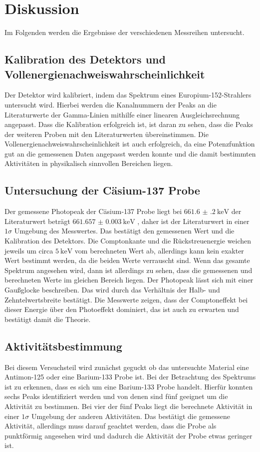 \section{Diskussion}
\label{sec:Diskussion}
Im Folgenden werden die Ergebnisse der verschiedenen Messreihen untersucht.

\subsection{Kalibration des Detektors und Vollenergienachweiswahrscheinlichkeit}
Der Detektor wird kalibriert, indem das Spektrum eines Europium-152-Strahlers untersucht wird.
Hierbei werden die Kanalnummern der Peaks an die Literaturwerte \cite{Gamma_lit} der Gamma-Linien mithilfe einer linearen 
Ausgleichsrechnung angepasst. Dass die Kalibration erfolgreich ist, ist daran zu sehen, dass die Peaks der weiteren
Proben mit den Literaturwerten übereinstimmen.
Die Vollenergienachweiswahrscheinlichkeit ist auch erfolgreich, da eine Potenzfunktion gut an die gemessenen Daten angepasst werden konnte und die 
damit bestimmten Aktivitäten in physikalisch sinnvollen Bereichen liegen. 

\subsection{Untersuchung der Cäsium-137 Probe}
Der gemessene Photopeak der Cäsium-137 Probe liegt bei $\SI{661.6(2)}{\kilo\eV}$ der Literaturwert beträgt $\SI{661.657(3)}{\kilo\eV}$ \cite{Gamma_lit},
daher ist der Literaturwert in einer $1\sigma$ Umgebung des Messwertes. Das bestätigt den gemessenen Wert und die Kalibration des 
Detektors. Die Comptonkante und die Rückstreuenergie weichen jeweils um circa $\SI{5}{\kilo\eV}$ vom berechneten Wert ab, allerdings
kann kein exakter Wert bestimmt werden, da die beiden Werte verrauscht sind. Wenn das gesamte Spektrum angesehen wird, dann ist allerdings 
zu sehen, dass die gemessenen und berechneten Werte im gleichen Bereich liegen.
Der Photopeak lässt sich mit einer Gaußglocke beschreiben. Das wird durch das Verhältnis der Halb- und Zehntelwertsbreite 
bestätigt. 
Die Messwerte zeigen, dass der Comptoneffekt bei dieser Energie über den Photoeffekt dominiert, das ist auch zu erwarten und bestätigt 
damit die Theorie.

\subsection{Aktivitätsbestimmung}
Bei diesem Versuchsteil wird zunächst geguckt ob das untersuchte Material eine Antimon-125 oder eine Barium-133 Probe ist.
Bei der Betrachtung des Spektrums ist zu erkennen, dass es sich um eine Barium-133 Probe handelt.
Hierfür konnten sechs Peaks identifiziert werden und von denen sind fünf geeignet um die Aktivität zu bestimmen.
Bei vier der fünf Peaks liegt die berechnete Aktivität in einer $1\sigma$ Umgebung der anderen Aktivitäten. 
Das bestätigt die gemessene Aktivität, allerdings muss darauf geachtet werden, dass die Probe als punktförmig angesehen wird
und dadurch die Aktivität der Probe etwas geringer ist.

